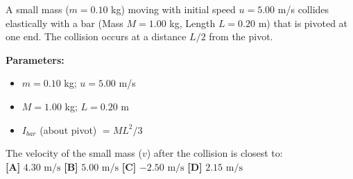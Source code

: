             



\begin{minipage}{\linewidth}
\begin{tcolorbox}[
    title={\textbf{JEE Advanced 2023 Paper 1}},
    colback=white,
    colframe=gray!50!black,
    arc=3pt,
    boxrule=1pt,
    fonttitle=\sffamily\large,
    width=\linewidth
]

    \begin{tcolorbox}[
        colback=gray!5,
        colframe=gray!20,
        coltitle=black,
        title={\small \textbf{QUESTION}},
        fontupper=\small\sffamily,
        boxrule=0.5pt,
        sharp corners,
        left=3pt, right=3pt, top=3pt, bottom=3pt
    ]
        A small mass ($m = 0.10$ kg) moving with initial speed $u = 5.00$ m/s collides elastically with a bar (Mass $M = 1.00$ kg, Length $L = 0.20$ m) that is pivoted at one end. The collision occurs at a distance $L/2$ from the pivot.
        \vspace{0.5em}
        
        \textbf{Parameters:}
        \begin{itemize}[nosep, leftmargin=1.5em]
            \item $m = 0.10$ kg; $u = 5.00$ m/s
            \item $M = 1.00$ kg; $L = 0.20$ m
            \item $I_{bar}$ (about pivot) $= ML^2 / 3$
        \end{itemize}
        \vspace{0.5em}
        The velocity of the small mass ($v$) after the collision is closest to:\\
        \textbf{[A]} $4.30\text{ m/s}$ \quad \textbf{[B]} $5.00\text{ m/s}$ \quad \textbf{[C]} $-2.50\text{ m/s}$ \quad \textbf{[D]} $2.15\text{ m/s}$
    \end{tcolorbox}


\end{tcolorbox}
\end{minipage}
